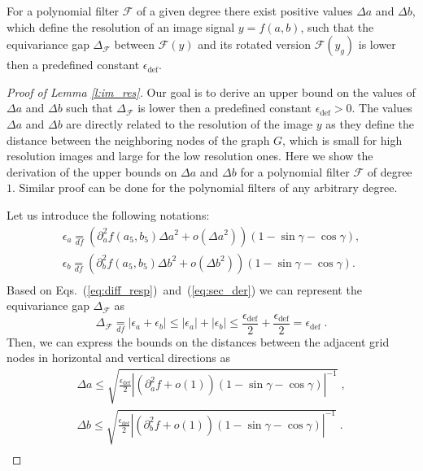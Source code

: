 \documentclass[10pt,journal,compsoc]{IEEEtran}
\newcommand{\df}{\mathop{=}\limits_{df}}
\begin{document}
	\begin{lemma}
		For a polynomial filter $\mathcal{F}$ of a given degree there exist positive values $\Delta a$ and $\Delta b$, which define the resolution of an image signal $y=f(a,b)$, such that the equivariance gap $\Delta_\mathcal{F}$ between $\mathcal{F}(y)$ and its rotated version $\mathcal{F}(y_g)$ is lower then a predefined constant $\epsilon_\text{def}$.
		\label{l:im_res}
	\end{lemma}
	\begin{proof}[Proof of Lemma \ref{l:im_res}]
		Our goal is to derive an upper bound on the values of $\Delta a$ and $\Delta b$ such that $\Delta_\mathcal{F}$ is lower then a predefined constant $\epsilon_\text{def} > 0$. The values $\Delta a$ and $\Delta b$ are directly related to the resolution of the image $y$ as they define the distance between the neighboring nodes of the graph $G$, which is small for high resolution images and large for the low resolution ones. Here we show the derivation of the upper bounds on $\Delta a$ and $\Delta b$ for a polynomial filter $\mathcal{F}$ of degree $1$. Similar proof can be done for the polynomial filters of any arbitrary degree.
		
		Let us introduce the following notations:
		\begin{equation}
		\begin{aligned}
		\epsilon_a \df \left(\partial^2_a f (a_5,b_5) \Delta a^2 + o(\Delta a^2)\right)(1-\sin\gamma -\cos\gamma), \\
		\epsilon_b \df \left(\partial^2_b f (a_5,b_5) \Delta b^2 + o(\Delta b^2)\right)(1-\sin\gamma -\cos\gamma). \\ 
		\end{aligned}
		\end{equation}
		\noindent
		Based on Eqs.~(\ref{eq:diff_resp})~and~(\ref{eq:sec_der}) we can represent the equivariance gap $\Delta_\mathcal{F}$ as 
		\begin{equation}
		\Delta_\mathcal{F} \df |\epsilon_a + \epsilon_b| \leq |\epsilon_a| + |\epsilon_b| \leq  \frac{\epsilon_\text{def}}{2} + \frac{\epsilon_\text{def}}{2} = \epsilon_\text{def} \;.
		\label{eq:cond_diff}
		\end{equation}
		\noindent
		Then, we can express the bounds on the distances between the adjacent grid nodes in horizontal and vertical directions as
		\begin{equation}
		\begin{aligned}
		\Delta a \leq \sqrt{\frac{\epsilon_\text{def}}{2} \left|\left(\partial^2_a f + o(1)\right)(1-\sin\gamma -\cos\gamma)\right|^{-1}}\;, \\
		\Delta b \leq \sqrt{\frac{\epsilon_\text{def}}{2} \left|\left(\partial^2_b f + o(1)\right)(1-\sin\gamma -\cos\gamma)\right|^{-1}}\;. \\
		\end{aligned}
		\label{eq:response_pattern_r}
		\end{equation} 
		

\end{proof}
\end{document}
